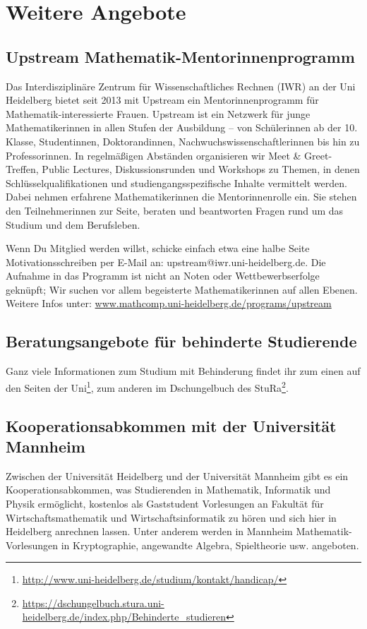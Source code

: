 \section*{Weitere Angebote}

\subsection*{Upstream Mathematik-Mentorinnenprogramm}
Das Interdisziplinäre Zentrum für Wissenschaftliches Rechnen (IWR) an der Uni Heidelberg bietet seit 2013 mit Upstream ein Mentorinnenprogramm für Mathematik-interessierte Frauen. Upstream ist ein Netzwerk für junge Mathematikerinnen in allen Stufen der Ausbildung -- von Schülerinnen ab der 10. Klasse, Studentinnen, Doktorandinnen, Nachwuchswissenschaftlerinnen bis hin zu Professorinnen. In regelmäßigen Abständen organisieren wir Meet \& Greet-Treffen, Public Lectures, Diskussionsrunden und Workshops zu Themen, in denen Schlüsselqualifikationen und studiengangsspezifische Inhalte vermittelt werden. Dabei nehmen erfahrene Mathematikerinnen die Mentorinnenrolle ein. Sie stehen den Teilnehmerinnen zur Seite, beraten und beantworten Fragen rund um das Studium und dem Berufsleben.

Wenn Du Mitglied werden willst, schicke einfach etwa eine halbe Seite Motivationsschreiben per E-Mail an: upstream@iwr.uni-heidelberg.de. Die Aufnahme in das Programm ist nicht an Noten oder Wettbewerbserfolge geknüpft; Wir suchen vor allem begeisterte Mathematikerinnen auf allen Ebenen. Weitere Infos unter: \url{www.mathcomp.uni-heidelberg.de/programs/upstream}

\subsection*{Beratungsangebote für behinderte Studierende}
Ganz viele Informationen zum Studium mit Behinderung findet ihr zum einen auf den Seiten der Uni\footnote{\url{http://www.uni-heidelberg.de/studium/kontakt/handicap/}}, zum anderen im Dschungelbuch des StuRa\footnote{\url{https://dschungelbuch.stura.uni-heidelberg.de/index.php/Behinderte_studieren}}.

\subsection*{Kooperationsabkommen mit der Universität Mannheim}
Zwischen der Universität Heidelberg und der Universität Mannheim 
gibt es ein Kooperationsabkommen, was Studierenden in Mathematik, Informatik
und Physik ermöglicht, kostenlos als Gaststudent Vorlesungen an Fakultät für Wirtschaftsmathematik
und Wirtschaftsinformatik zu hören und sich hier in Heidelberg anrechnen lassen.
Unter anderem werden in Mannheim Mathematik-Vorlesungen in Kryptographie, 
angewandte Algebra, Spieltheorie usw. angeboten.

